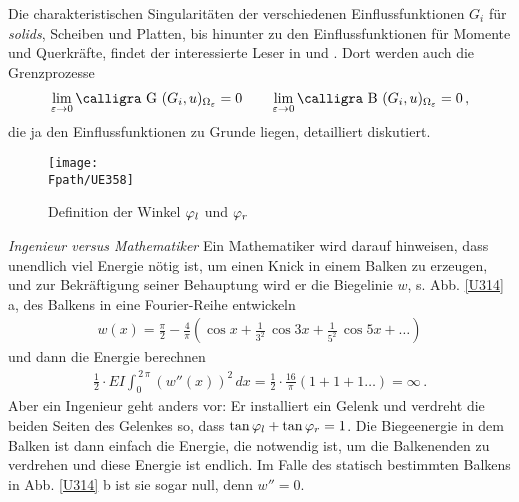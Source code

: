 {{{{{\begin{remark}
Die charakteristischen Singularit\"{a}ten der verschiedenen Einflussfunktionen $G_i$ f\"{u}r  {\em solids\/}, Scheiben und Platten, bis hinunter zu den Einflussfunktionen f\"{u}r Momente und Querkr\"{a}fte, findet der interessierte Leser in \cite{Ha2} und \cite{Ha3}. Dort werden auch die Grenzprozesse
\begin{align}
\lim_{\varepsilon \to 0} \text{\normalfont\calligra G\,\,}(G_i,u)_{\Omega_\varepsilon} = 0 \qquad \lim_{\varepsilon \to 0} \text{\normalfont\calligra B\,\,}(G_i,u)_{\Omega_\varepsilon} = 0\,,
\end{align}
die ja den Einflussfunktionen zu Grunde liegen, detailliert diskutiert.
\end{remark}

\begin{figure}[tbp]
\centering
\if {} \sidecaption \fi
\texttt{[image: \\Fpath/UE358]}
\caption{Definition der Winkel $\varphi_l$ und $\varphi_r$}
\label{UE358}
\end{figure}%


\begin{remark} {\em Ingenieur versus Mathematiker\/}\label{Fourierreihe}
Ein Mathematiker wird darauf hinweisen, dass unendlich viel Energie n\"{o}tig ist, um einen Knick in einem Balken zu erzeugen, und zur Bekr\"{a}ftigung seiner Behauptung wird er die Biegelinie $w$, s. Abb. \ref{U314} a, des Balkens in eine Fourier-Reihe entwickeln
\begin{align}
w(x)= \frac{\pi}{2} - \frac{4}{\pi}(\cos x + \frac{1}{3^2}\,\cos 3x + \frac{1}{5^2}\,\cos 5x + \ldots )
\end{align}
und dann die Energie berechnen
\begin{align}
\frac{1}{2} \cdot  EI\int_0^{\,2\,\pi} (w''(x))^2\,dx = \frac{1}{2}\cdot \frac{16}{\pi} (1 + 1 + 1 \ldots ) = \infty\,.
\end{align}
Aber ein Ingenieur geht anders vor: Er installiert ein Gelenk und verdreht die beiden Seiten des Gelenkes so, dass $\tan \varphi_l + \tan \varphi_r = 1$. Die Biegeenergie in dem Balken ist dann einfach die Energie, die notwendig ist, um die Balkenenden zu verdrehen und diese Energie ist endlich. Im Falle des statisch bestimmten Balkens in Abb. \ref{U314} b ist sie sogar null, denn $w'' = 0$.
\end{remark}

}}}}}
